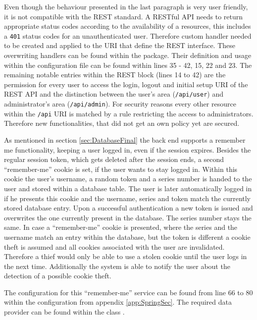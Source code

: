Even though the behaviour presented in the last paragraph is very user friendly, it is not compatible with the \gls{REST} standard. A \gls{REST}ful \gls{API} needs to return appropriate status codes according to the availability of a resources, this includes a \texttt{401} status codes for an unauthenticated user. Therefore custom handler needed to be created and applied to the \gls{URI} that define the \gls{REST} interface. These overwriting handlers can be found within the  package. Their definition and usage within the configuration file can be found within lines 35 - 42, 15, 22 and 23. The remaining notable entries within the \gls{REST} block (lines 14 to 42) are the permission for every user to access the login, logout and initial setup \gls{URI} of the \gls{REST} \gls{API} and the distinction between the user's area (\texttt{/api/user}) and administrator's area (\texttt{/api/admin}). For security reasons every other resource within the \texttt{/api} \gls{URI} is matched by a rule restricting the access to administrators. Therefore new functionalities, that did not get an own policy yet are secured.

As mentioned in section \vref{sec:DatabaseFinal} the back end supports a remember me functionality, keeping a user logged in, even if the session expires. Besides the regular session token, which gets deleted after the session ends, a second \enquote{remember-me} cookie is set, if the user wants to stay logged in. Within this cookie the user's username, a random token and a series number is handed to the user and stored within a database table. The user is later automatically logged in if he presents this cookie and the username, series and token match the currently stored database entry. Upon a successful authentication a new token is issued and overwrites the one currently present in the database. The series number stays the same. In case a \enquote{remember-me} cookie is presented, where the series and the username match an entry within the database, but the token is different a cookie theft is assumed and all cookies associated with the user are invalidated. Therefore a thief would only be able to use a stolen cookie until the user logs in the next time. Additionally the system is able to notify the user about the detection of a possible cookie theft. \cite{Jaspan:2006aa}

The configuration for this \enquote{remember-me} service can be found from line 66 to 80 within the configuration from appendix \vref{app:SpringSec}. The required data provider can be found within the class .

